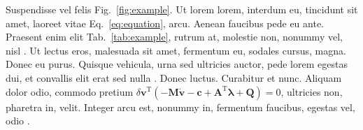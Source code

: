 \documentclass[letterpaper,11pt]{article}
\begin{document}
Suspendisse vel felis Fig.~\ref{fig:example}. Ut lorem lorem, interdum eu, tincidunt sit amet, laoreet vitae Eq.~\eqref{eq:equation}, arcu. Aenean faucibus pede eu ante. Praesent enim elit Tab.~\ref{tab:example}, rutrum at,  molestie non, nonummy vel, nisl \cite{book}. Ut lectus eros, malesuada sit amet, fermentum eu, sodales cursus, magna. Donec eu purus. Quisque vehicula, urna sed ultricies auctor, pede lorem egestas dui, et convallis elit erat sed nulla \cite{article}. Donec luctus. Curabitur et nunc. Aliquam dolor odio, commodo pretium $\delta \mathbf{v}^\mathrm{T} \left( -\mathbf{M} \dot{\mathbf{v}} - \mathbf{c} +   \mathbf{A}^\mathrm{T} \boldsymbol{\lambda} + \mathbf{Q}\right) = 0$, ultricies non, pharetra in, velit. Integer arcu est, nonummy in, fermentum faucibus, egestas vel, odio \cite{conference}.


\lipsum[7] %


\small

%
%
%
%
\end{document}
